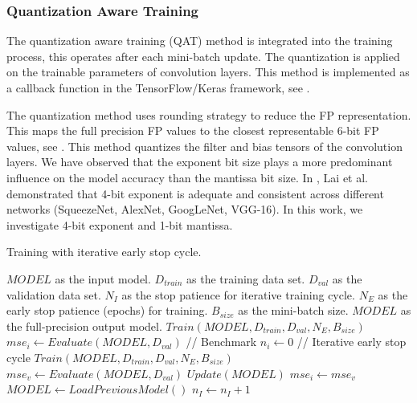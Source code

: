 
\subsubsection{Quantization Aware Training}
The quantization aware training (QAT) method is integrated into the training process, this operates after each mini-batch update. The quantization is applied on the trainable parameters of convolution layers. This method is implemented as a callback function in the TensorFlow/Keras framework, see .

The quantization method uses rounding strategy to reduce the FP representation. This maps the full precision FP values to the closest representable 6-bit FP values, see . This method quantizes the filter and bias tensors of the convolution layers. We have observed that the exponent bit size plays a more predominant influence on the model accuracy than the mantissa bit size. In \cite{lai2017deep}, Lai et al. demonstrated that 4-bit exponent is adequate and consistent across different networks (SqueezeNet, AlexNet, GoogLeNet, VGG-16). In this work, we investigate 4-bit exponent and 1-bit mantissa.

\begin{algorithm}[h!]
	\label{alg:training}
	\caption{Training with iterative early stop cycle.}
	\begin{algorithmic}
		\SetAlgoLined
		\renewcommand{\algorithmicrequire}{\textbf{input:}}
		\renewcommand{\algorithmicensure}{\textbf{output:}}
		\REQUIRE $MODEL$ as the input model.
		\REQUIRE $D_{train}$ as the training data set.
		\REQUIRE $D_{val}$ as the validation data set.
		\REQUIRE $N_{I}$ as the stop patience for iterative training cycle.
		\REQUIRE $N_{E}$ as the early stop patience (epochs) for training.
		\REQUIRE $B_{size}$ as the mini-batch size.
		\ENSURE $MODEL$ as the full-precision output model.
		\STATE $Train(MODEL, D_{train}, D_{val}, N_{E}, B_{size})$
		\STATE $mse_i \gets Evaluate(MODEL, D_{val})$ // Benchmark
		\STATE $n_i \gets 0$
		\STATE // Iterative early stop cycle
		\STATE $Train(MODEL, D_{train}, D_{val}, N_{E}, B_{size})$
		\STATE $mse_v \gets Evaluate(MODEL, D_{val})$
			\STATE $Update(MODEL)$
			\STATE $mse_i \gets mse_v$
		\ELSE
			\STATE $MODEL  \gets LoadPreviousModel()$
			\STATE $n_I \gets n_I + 1$
		\ENDIF
		\ENDWHILE
	\end{algorithmic}
\end{algorithm}


